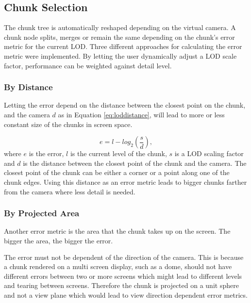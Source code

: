 \subsection{Chunk Selection}
\label{section:chunkselection}
The chunk tree is automatically reshaped depending on the virtual camera. A chunk node splits, merges or remain the same depending on the chunk's error metric for the current LOD. Three different approaches for calculating the error metric were implemented. By letting the user dynamically adjust a LOD scale factor, performance can be weighted against detail level.

\subsubsection{By Distance}
Letting the error depend on the distance between the closest point on the chunk, and the camera $d$ as in Equation \ref{eq:loddistance}, will lead to more or less constant size of the chunks in screen space.

\begin{equation}
	\label{eq:loddistance}
	e = l - log_2(\frac{s}{d}),
\end{equation}
where $e$ is the error, $l$ is the current level of the chunk, $s$ is a LOD scaling factor and $d$ is the distance between the closest point of the chunk and the camera. The closest point of the chunk can be either a corner or a point along one of the chunk edges. Using this distance as an error metric leads to bigger chunks farther from the camera where less detail is needed.


\subsubsection{By Projected Area}
Another error metric is the area that the chunk takes up on the screen. The bigger the area, the bigger the error. 

The error must not be dependent of the direction of the camera. This is because a chunk rendered on a multi screen display, such as a dome, should not have different errors between two or more screens which might lead to different levels and tearing between screens. Therefore the chunk is projected on a unit sphere and not a view plane which would lead to view direction dependent error metrics.

